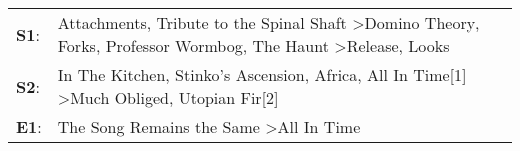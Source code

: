 \begin{supertabular}{p{0.03\textwidth}p{0.92\textwidth}}
 \textbf{S1}:  &  Attachments\textsuperscript{}, \enspace Tribute to the Spinal Shaft\textsuperscript{} \textgreater \enspace Domino Theory\textsuperscript{}, \enspace Forks\textsuperscript{}, \enspace Professor Wormbog\textsuperscript{}, \enspace The Haunt\textsuperscript{} \textgreater \enspace Release\textsuperscript{}, \enspace Looks\textsuperscript{}  \enspace  \\
 \textbf{S2}:  &                                                                                        In The Kitchen\textsuperscript{}, \enspace Stinko's Ascension\textsuperscript{}, \enspace Africa\textsuperscript{}, \enspace All In Time[1]\textsuperscript{} \textgreater \enspace Much Obliged\textsuperscript{}, \enspace Utopian Fir[2]\textsuperscript{}  \enspace  \\
 \textbf{E1}:  &                                                                                                                                                                                                                                                      The Song Remains the Same\textsuperscript{} \textgreater \enspace All In Time\textsuperscript{}  \enspace  \\
\end{supertabular}
